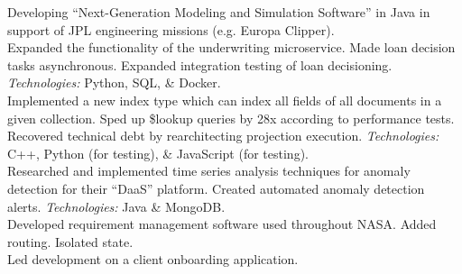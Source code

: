 \documentclass[11pt,letter,sans]{moderncv}
\begin{document}
Developing ``Next-Generation Modeling and Simulation Software'' in Java in support of JPL engineering missions (e.g. Europa Clipper).
\\
Expanded the functionality of the underwriting microservice.
Made loan decision tasks asynchronous.
Expanded integration testing of loan decisioning.
\textit{Technologies:} Python, SQL, \& Docker.
\\
Implemented a new index type which can index all fields of all documents in a given collection.
Sped up \$lookup queries by 28x according to performance tests.
Recovered technical debt by rearchitecting projection execution.
\textit{Technologies:} C++, Python (for testing), \& JavaScript (for testing).
\\
Researched and implemented time series analysis techniques for anomaly detection for their ``DaaS'' platform. Created automated anomaly detection alerts.
\textit{Technologies:} Java \& MongoDB.
\\
Developed requirement management software used throughout NASA.
Added routing. Isolated state.
\\
Led development on a client onboarding application.
\end{document}
